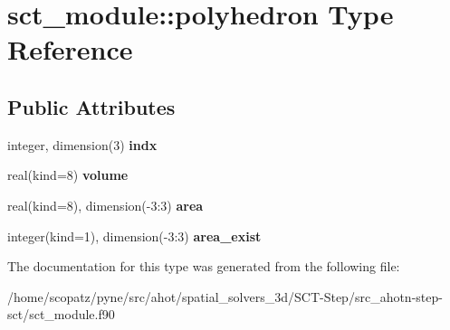\hypertarget{structsct__module_1_1polyhedron}{\section{sct\-\_\-module\-:\-:polyhedron Type Reference}
\label{structsct__module_1_1polyhedron}
}
\subsection*{Public Attributes}
\begin{DoxyCompactItemize}
\item 
\hypertarget{structsct__module_1_1polyhedron_a0a9f5f4cc18647a9ebeb2318bc83dfa7}{integer, dimension(3) {\bfseries indx}}\label{structsct__module_1_1polyhedron_a0a9f5f4cc18647a9ebeb2318bc83dfa7}

\item 
\hypertarget{structsct__module_1_1polyhedron_afc1244f7652724346f6ce31ff39214c3}{real(kind=8) {\bfseries volume}}\label{structsct__module_1_1polyhedron_afc1244f7652724346f6ce31ff39214c3}

\item 
\hypertarget{structsct__module_1_1polyhedron_ad7c601a870a982c8a0b30bd2ee3b1427}{real(kind=8), dimension(-\/3\-:3) {\bfseries area}}\label{structsct__module_1_1polyhedron_ad7c601a870a982c8a0b30bd2ee3b1427}

\item 
\hypertarget{structsct__module_1_1polyhedron_a4d8b6322e32640812e3c917645febc0b}{integer(kind=1), dimension(-\/3\-:3) {\bfseries area\-\_\-exist}}\label{structsct__module_1_1polyhedron_a4d8b6322e32640812e3c917645febc0b}

\end{DoxyCompactItemize}


The documentation for this type was generated from the following file\-:\begin{DoxyCompactItemize}
\item 
/home/scopatz/pyne/src/ahot/spatial\-\_\-solvers\-\_\-3d/\-S\-C\-T-\/\-Step/src\-\_\-ahotn-\/step-\/sct/sct\-\_\-module.\-f90\end{DoxyCompactItemize}
